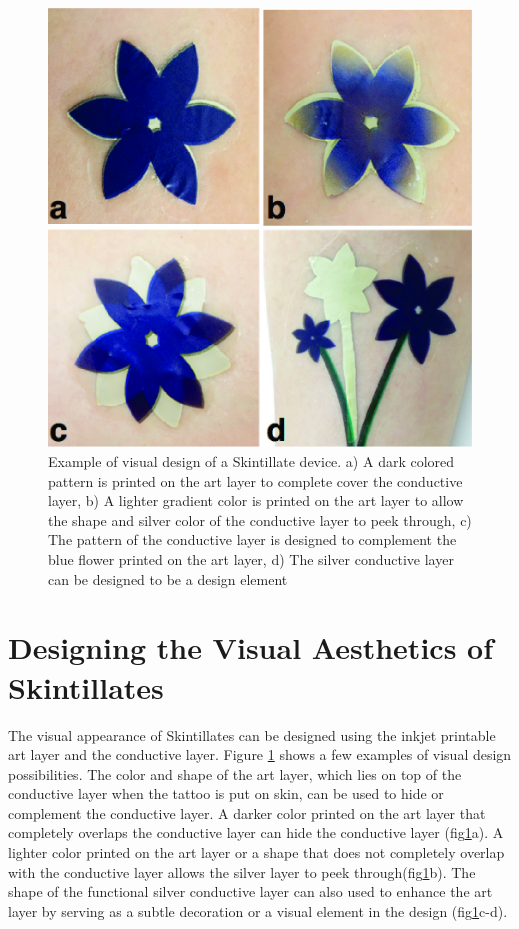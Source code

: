 \documentclass{sigchi}
\begin{document}
\begin{figure}[!h]
\centering
\includegraphics[width=0.8\columnwidth]{figures/Figure5}
\caption{Example of visual design of a Skintillate device. a) A dark colored pattern is printed on the art layer to complete cover the conductive layer, b) A lighter gradient color is printed on the art layer to allow the shape and silver color of the conductive layer to peek through, c) The pattern of the conductive layer is designed to complement the blue flower printed on the art layer, d) The silver conductive layer can be designed to be a design element}
\vspace{-8pt}
\label{fig:design}
\end{figure}
\section{Designing the Visual Aesthetics of Skintillates}
The visual appearance of Skintillates can be designed using the inkjet printable art layer and the conductive layer. Figure \ref{fig:design} shows a few examples of visual design possibilities. The color and shape of the art layer, which lies on top of the conductive layer when the tattoo is put on skin, can be used to hide or complement the conductive layer. A darker color printed on the art layer that completely overlaps the conductive layer can hide the conductive layer (fig\ref{fig:design}a). A lighter color printed on the art layer or a shape that does not completely overlap with the conductive layer allows the silver layer to peek through(fig\ref{fig:design}b). The shape of the functional silver conductive layer can also used to enhance the art layer by serving as a subtle decoration or a visual element in the design (fig\ref{fig:design}c-d). 
\end{document}
